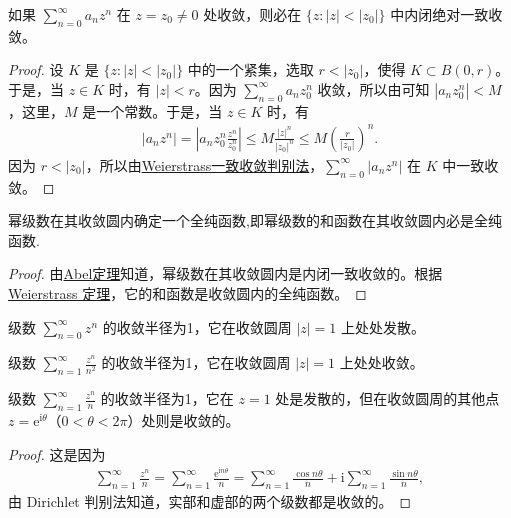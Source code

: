 \documentclass[../../main.tex]{subfiles}
\begin{document}
\begin{theorem}[Abel定理]\label{theorem:Abel定理-定理4.2.3}
如果 \( \sum_{n=0}^{\infty} a_n z^n \) 在 \( z = z_0 \neq 0 \) 处收敛，则必在 \( \{z : |z| < |z_0|\} \) 中内闭绝对一致收敛。
\end{theorem}
\begin{proof}
设 \( K \) 是 \( \{z : |z| < |z_0|\} \) 中的一个紧集，选取 \( r < |z_0| \)，使得 \( K \subset B(0, r) \)。于是，当 \( z \in K \) 时，有 \( |z| < r \)。因为 \( \sum_{n=0}^{\infty} a_n z_0^n \) 收敛，所以由可知 \( |a_n z_0^n| < M \)，这里，\( M \) 是一个常数。于是，当 \( z \in K \) 时，有
\begin{align*}
|a_n z^n| = \left| a_n z_0^n \frac{z^n}{z_0^n} \right| \leqslant M \frac{|z|^n}{|z_0|^n} \leqslant M \left( \frac{r}{|z_0|} \right)^n.
\end{align*}
因为 \( r < |z_0| \)，所以由\hyperref[theorem:Weierstrass一致收敛判别法]{Weierstrass一致收敛判别法}，\( \sum_{n=0}^{\infty} |a_n z^n| \) 在 \( K \) 中一致收敛。
\end{proof}

\begin{theorem}\label{theorem:定理4.2.4}
幂级数在其收敛圆内确定一个全纯函数,即幂级数的和函数在其收敛圆内必是全纯函数.
\end{theorem}
\begin{proof}
由\hyperref[theorem:Abel定理-定理4.2.3]{Abel定理}知道，幂级数在其收敛圆内是内闭一致收敛的。根据 \hyperref[theorem:Weierstrass定理]{Weierstrass 定理}，它的和函数是收敛圆内的全纯函数。
\end{proof}

\begin{example}
级数 \( \sum_{n=0}^{\infty} z^n \) 的收敛半径为1，它在收敛圆周 \( |z| = 1 \) 上处处发散。
\end{example}

\begin{example}
级数 \( \sum_{n=1}^{\infty} \frac{z^n}{n^2} \) 的收敛半径为1，它在收敛圆周 \( |z| = 1 \) 上处处收敛。
\end{example}

\begin{example}
级数 \( \sum_{n=1}^{\infty} \frac{z^n}{n} \) 的收敛半径为1，它在 \( z = 1 \) 处是发散的，但在收敛圆周的其他点 \( z = \mathrm{e}^{\mathrm{i}\theta} \)（\( 0 < \theta < 2\pi \)）处则是收敛的。
\end{example}
\begin{proof}
这是因为
\begin{align*}
\sum_{n=1}^{\infty} \frac{z^n}{n} = \sum_{n=1}^{\infty} \frac{\mathrm{e}^{\mathrm{i}n\theta}}{n} = \sum_{n=1}^{\infty} \frac{\cos n\theta}{n} + \mathrm{i}\sum_{n=1}^{\infty} \frac{\sin n\theta}{n},
\end{align*}
由 Dirichlet 判别法知道，实部和虚部的两个级数都是收敛的。
\end{proof}
\end{document}
